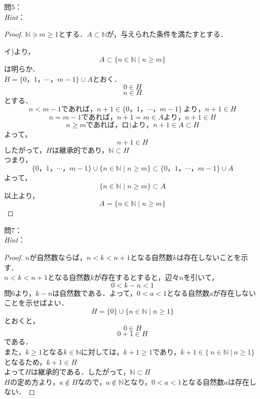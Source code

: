 \documentclass[dvipdfmx,uplatex,11pt]{jsarticle}
\theoremstyle{definition}
\begin{document}
%
\newpage
%
\setcounter{equation}{0}
\noindent
問5：
\\
\textsl{Hint}：\\
\dotfill
%
% 
%
\begin{leftbar}
	\begin{proof}
		$\mathbb{N} \ni m \ge 1$とする．$A \subset \mathbb{N}$が，与えられた条件を満たすとする．\par
		イ)より，
		\[ A \subset \{n \in \mathbb{N} \mid n \ge m\} \]
		は明らか．\\
		$H=\{0，1，\cdots，m-1\} \cup A$とおく．
		\begin{equation}
			0 \in H
		\end{equation}
		\begin{equation}
			n \in H
		\end{equation}
		とする．\\
		\[ n<m-1であれば，n+1 \in \{0，1，\cdots，m-1\}~より，n+1 \in H \]
		\[ n=m-1であれば，n+1=m \in Aより，n+1 \in H\]
		\[ n \ge mであれば，ロ)より，n+1 \in A \subset H \]
		よって，
		\[
			n+1 \in H
		\]
		したがって，$H$は継承的であり，$\mathbb{N} \subset H$\\
		つまり，\\
		\[
			\{0，1，\cdots，m-1\} \cup \{n \in \mathbb{N} \mid n \ge m \} \subset \{0，1，\cdots，m-1\} \cup A
		\]
		よって，
		\[
			\{n \in \mathbb{N}\mid n \ge m \} \subset A
		\]
		以上より，
		\[
			A=\{n \in \mathbb{N} \mid n \ge m\}
		\]
	\end{proof}
\end{leftbar}
%
\newpage
%
\noindent
問7：
\\
\textsl{Hint}：\\
\dotfill
%
\begin{leftbar}
	\begin{proof}
		$n$が自然数ならば，$n <k <n+1$となる自然数$k$は存在しないことを示す．\\
		$n < k < n+1$となる自然数$k$が存在するとすると，辺々$n$を引いて，
		\[ 0 < k - n < 1 \]
		問6より，$k-n$は自然数である．よって，$0<a<1$となる自然数$a$が存在しないことを示せばよい．\\
		\[ H=\{0\} \cup \{n \in \mathbb{N} \mid n \ge 1 \} \]
		とおくと，
		\begin{equation}
			0 \in H
		\end{equation}
		\begin{equation}
			0+1 \in H
		\end{equation}
		である．\\
		また，$k \ge 1$となる$k \in \mathbb{N}$に対しては，$k +1 \ge 1$であり，$k+1 \in \{~n \in \mathbb{N}~|~n \ge 1 \} $となるため，$k+1 \in H$\\
		よって$H$は継承的である．したがって，$\mathbb{N} \subset H$\\
		$H$の定め方より，$a \notin H$なので，$a \notin \mathbb{N}$となり，$0<a<1$となる自然数$a$は存在しない．
	\end{proof}
\end{leftbar}
%
\newpage
%
\setcounter{equation}{0}
\end{document}
